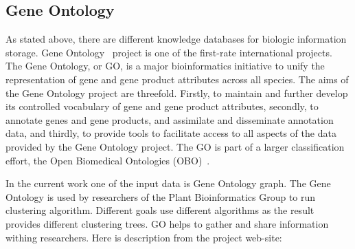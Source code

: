 \subsection{Gene Ontology}
\label{sec:gene_ontology}

As stated above, there are different knowledge databases for biologic information storage.
Gene Ontology~\cite{GO_website} project is one of the first-rate international projects.
The Gene Ontology, or GO, is a major bioinformatics initiative to unify the representation of gene and gene product attributes across all species.
The aims of the Gene Ontology project are threefold. Firstly, to maintain and further develop its controlled vocabulary of gene and gene product attributes,
secondly, to annotate genes and gene products, and assimilate and disseminate annotation data,
and thirdly, to provide tools to facilitate access to all aspects of the data provided by the Gene Ontology project. The GO is part of a larger classification effort, the Open Biomedical Ontologies (OBO)~\cite{OBO}.

In the current work one of the input data is Gene Ontology graph. The Gene Ontology is used by researchers of the Plant Bioinformatics Group to run clustering algorithm. Different goals use different algorithms as the result provides different clustering trees. GO helps to gather and share information withing researchers. Here is description from the project web-site:

